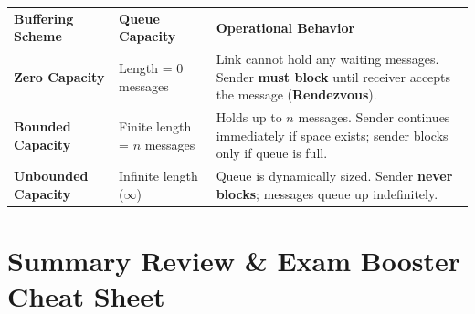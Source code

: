 \documentclass[11pt,a4paper]{article}
\begin{document}
\begin{center}
\begin{tabularx}{\linewidth}{L{3.2cm} L{3.5cm} X}
  \color{white}\textbf{Buffering Scheme} &
  \color{white}\textbf{Queue Capacity} &
  \color{white}\textbf{Operational Behavior} \\
  \textbf{Zero Capacity} & Length = $0$ messages & Link cannot hold any waiting messages. Sender \textbf{must block} until receiver accepts the message (\textbf{Rendezvous}). \\
  \textbf{Bounded Capacity} & Finite length = $n$ messages & Holds up to $n$ messages. Sender continues immediately if space exists; sender blocks only if queue is full. \\
  \textbf{Unbounded Capacity} & Infinite length ($\infty$) & Queue is dynamically sized. Sender \textbf{never blocks}; messages queue up indefinitely. \\
\end{tabularx}
\end{center}

\section{Summary Review \& Exam Booster Cheat Sheet}
\end{document}
